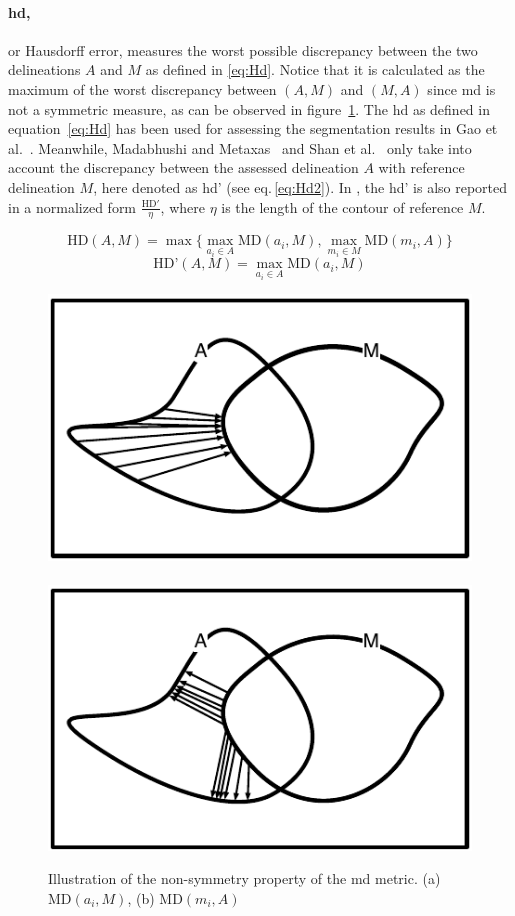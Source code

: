 \paragraph{\acf{hd},} or Hausdorff error, measures the worst possible discrepancy between the two delineations $A$ and $M$ as defined in \ref{eq:Hd}. Notice that it is calculated as the maximum of the worst discrepancy between $(A,M)$ and  $(M,A)$ since \ac{md} is not a symmetric measure, as can be observed in figure~\ref{fig:md}. The \ac{hd} as defined in equation~\ref{eq:Hd} has been used for assessing the segmentation results in Gao et al.~\cite{Gao:2012p14336}. Meanwhile, Madabhushi and Metaxas~\cite{Madabhushi:2003p6036} and Shan et al.~\cite{Shan:2012p14347} only take into account the discrepancy between the assessed delineation $A$ with reference delineation $M$, here denoted as \ac{hd}' (see eq.\,\ref{eq:Hd2}). In \cite{Madabhushi:2003p6036,Shan:2012p14347}, the \ac{hd}' is also reported in a normalized form $\frac{\text{HD}'}{\eta}$, where $\eta$ is the length of the contour of reference $M$.

\begin{equation}
\text{HD} (A,M) = \max \bigg \{ \max_{a_i \in A} \text{MD}(a_i,M), \max_{m_i \in M} \text{MD}(m_i,A)  \bigg \}
\label{eq:Hd}
\end{equation}
\begin{equation}
\label{eq:Hd2}
\text{HD'} (A,M) = \max_{a_i \in A} \text{MD}(a_i,M)
\end{equation}

\begin{figure}
\centering
\includegraphics[height=.3\textwidth]{mdA-M}~
\includegraphics[height=.3\textwidth]{mdM-A}

\caption[Non-symmetry propoerty of the \ac{md} metric.]{Illustration of the non-symmetry property of the \acf{md} metric. (a) $\text{MD}(a_i,M)$, (b) $\text{MD}(m_i,A)$}
\label{fig:md}
\end{figure}


